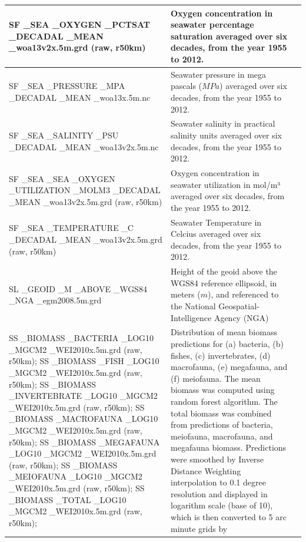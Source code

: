 \documentclass[journal abbreviation, manuscript]{copernicus}
\begin{document}
\begin{longtable}{|p{}|p{}|p{}|}
        SF \_SEA \_OXYGEN \_PCTSAT \_DECADAL \_MEAN \_woa13v2x.5m.grd (raw, r50km) & Oxygen concentration in seawater percentage saturation averaged over six decades, from the year 1955 to 2012. & \cite{WOA13X2013}\\
        \hline 
        SF \_SEA \_PRESSURE \_MPA \_DECADAL \_MEAN \_woa13x.5m.nc & Seawater pressure in mega pascals ($MPa$) averaged over six decades, from the year 1955 to 2012. & \cite{WOA13X2013} \\
        \hline 
        SF \_SEA \_SALINITY \_PSU \_DECADAL \_MEAN \_woa13v2x.5m.nc & Seawater salinity in practical salinity units averaged over six decades, from the year 1955 to 2012. & \cite{WOA13X2013} \\
        \hline 
        SF \_SEA \_SEA \_OXYGEN \_UTILIZATION \_MOLM3 \_DECADAL \_MEAN \_woa13v2x.5m.grd (raw, r50km) & Oxygen concentration in seawater utilization in mol/m³ averaged over six decades, from the year 1955 to 2012. &  \cite{WOA13X2013}\\
        \hline 
        SF \_SEA \_TEMPERATURE \_C \_DECADAL \_MEAN \_woa13v2x.5m.grd (raw, r50km) &  Seawater Temperature in Celcius averaged over six decades, from the year 1955 to 2012. & \cite{WOA13X2013} \\
        \hline 
        SL \_GEOID \_M \_ABOVE \_WGS84 \_NGA \_egm2008.5m.grd & Height of the geoid above the WGS84 reference ellipsoid, in meters ($m$), and referenced to the National Geospatial-Intelligence Agency (NGA)
& \cite{NGA_EGM20082008} \\
        \hline 
        SS \_BIOMASS \_BACTERIA \_LOG10 \_MGCM2 \_WEI2010x.5m.grd (raw, r50km); SS \_BIOMASS \_FISH \_LOG10 \_MGCM2 \_WEI2010x.5m.grd (raw, r50km); SS \_BIOMASS \_INVERTEBRATE \_LOG10 \_MGCM2 \_WEI2010x.5m.grd (raw, r50km); SS \_BIOMASS \_MACROFAUNA \_LOG10 \_MGCM2 \_WEI2010x.5m.grd (raw, r50km); SS \_BIOMASS \_MEGAFAUNA \_LOG10 \_MGCM2 \_WEI2010x.5m.grd (raw, r50km); SS \_BIOMASS \_MEIOFAUNA \_LOG10 \_MGCM2 \_WEI2010x.5m.grd (raw, r50km); SS \_BIOMASS \_TOTAL \_LOG10 \_MGCM2 \_WEI2010x.5m.grd (raw, r50km); & Distribution of mean biomass predictions for (a) bacteria, (b) fishes, (c) invertebrates, (d) macrofauna, (e) megafauna, and (f) meiofauna. The mean biomass was computed using random forest algorithm. The total biomass was combined from predictions of bacteria, meiofauna, macrofauna, and megafauna biomass. Predictions were smoothed by Inverse Distance Weighting interpolation to 0.1 degree resolution and displayed in logarithm scale (base of 10), which is then converted to 5 arc minute grids by \cite{LeeTOCkNN} & \cite{WEI2010} \\

\end{longtable}
\end{document}
